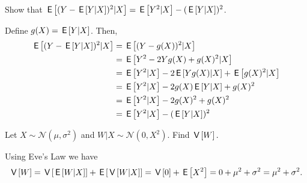 \begin{exercise}
Show that $\E{(Y - \E{Y |X})^2|X} = \E{Y^2|X} - (\E{Y |X})^2$.

\begin{solution}
Define $g(X) = \E{Y|X}$. Then,
\begin{align}
    \E{(Y - \E{Y |X})^2|X}&= \E{(Y - g(X))^2|X}\\
    &=\E{Y^2-2Yg(X)+g(X)^2|X}\\
    &=\E{Y^2|X}-2\E{Yg(X)|X}+\E{g(X)^2|X}\\
    &=\E{Y^2|X}-2g(X)\E{Y|X}+g(X)^2\\
    &=\E{Y^2|X}-2g(X)^2+g(X)^2\\
    &=\E{Y^2|X}-(\E{Y |X})^2
\end{align}
\end{solution}
\end{exercise}


\begin{exercise}
Let $X\sim \mathcal{N}(\mu,\sigma^2)$ and $W|X \sim \mathcal{N}(0,X^2)$. Find $\V{W}.$
\begin{solution}
Using Eve's Law we have
\begin{align}
    \V{W} = \V{\E{W|X}}+\E{\V{W|X}} =\V{0} + \E{X^2} = 0+  \mu^2 + \sigma^2 = \mu^2 + \sigma^2.
\end{align}

\end{solution}
\end{exercise}




